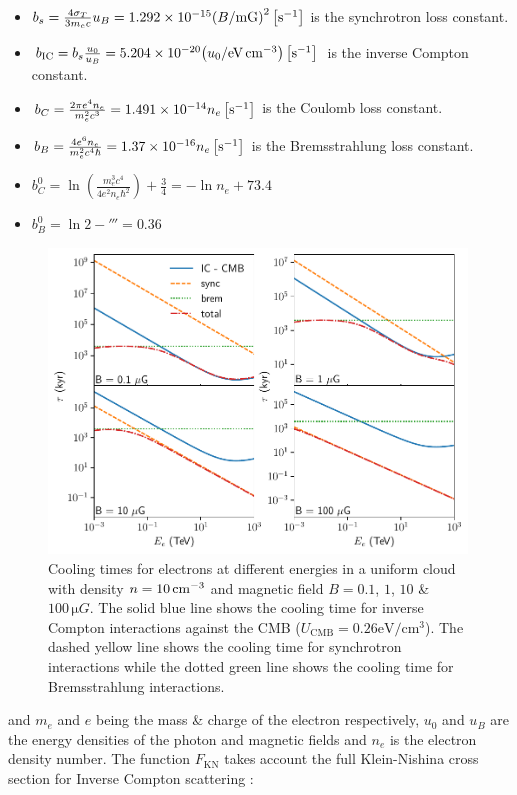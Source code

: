 \begin{itemize}[noitemsep]
	\item $b_s=\frac{4\sigma_T}{3m_ec}u_B=1.292\times 10^{-15}\qty(B/\si{\milli G})^2\,\qty[\persec]$ is the synchrotron loss constant.
	\item $b_\text{IC}=b_s\frac{u_0}{u_B}=5.204\times 10^{-20}\qty(u_0/\si{\electronvolt\per\centi\meter\cubed})\,\qty[\persec]$ is the inverse Compton constant.
	\item $b_C=\frac{2\pi e^4 n_e}{m_e^2 c^3}=1.491\times 10^{-14}n_e\,\qty[\persec]$ is the Coulomb loss constant.
	\item $b_B=\frac{4e^6 n_e}{m_e^2c^4\hbar}=1.37\times 10^{-16}n_e\,\qty[\persec]$ is the Bremsstrahlung loss constant.
	\item $b_C^0=\ln(\frac{m_e^3c^4}{4e^2n_e\hbar^2})+\frac{3}{4}=-\ln n_e+73.4$
	\item $b_B^0=\ln 2-\third=0.36$
\end{itemize}
\begin{figure}[b!]
    \includegraphics[width=0.99\textwidth]{04_Introduction/Images/non_thermal_emission/cooling_time_final.pdf}
    \caption{Cooling times for electrons at different energies in a uniform cloud with density $n=10\,\centimeterminusthree$ and magnetic field $B = 0.1$, $1$, $10$ \& $100\,\si{\micro G}$. The solid blue line shows the cooling time for inverse Compton interactions against the CMB ($U_\text{CMB}=0.26\si{\electronvolt\per\centi\meter\cubed}$). The dashed yellow line shows the cooling time for synchrotron interactions while the dotted green line shows the cooling time for Bremsstrahlung interactions.}
    \label{fig:chapter_1_non_thermal_emission_lep_cooling_losses}
\end{figure}
\noindent and $m_e$ and $e$ being the mass \& charge of the electron respectively, $u_0$ and $u_B$ are the energy densities of the photon and magnetic fields and $n_e$ is the electron density number. The function $F_\text{KN}$ takes account the full Klein-Nishina cross section for Inverse Compton scattering \citep{2007A&A...474..689M}:

